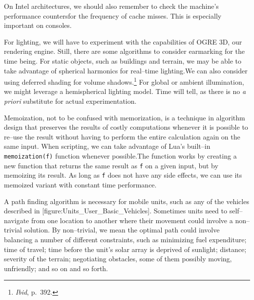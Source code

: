 On Intel architectures, we should also remember to check the machine's performance counters for the frequency of cache misses. This is especially important on consoles.

For lighting, we will have to experiment with the capabilities of OGRE 3D, our rendering engine. Still, there are some algorithms to consider earmarking for the time being. For static objects, such as buildings and terrain, we may be able to take advantage of spherical harmonics for real--time lighting. We can also consider using deferred shading for volume shadows.\footnote{{\it Ibid}, p.~392.} For global or ambient illumination, we might leverage a hemispherical lighting model. Time will tell, as there is no {\it a priori} substitute for actual experimentation.

Memoization, not to be confused with memorization, is a technique in algorithm design that preserves the results of costly computations whenever it is possible to re--use the result without having to perform the entire calculation again on the same input. When scripting, we can take advantage of Lua's built--in {\tt memoization(f)} function whenever possible. The function works by creating a new function that returns the same result as {\tt f} on a given input, but by memoizing its result. As long as {\tt f} does not have any side effects, we can use its memoized variant with constant time performance.

A path finding algorithm is necessary for mobile units, such as any of the vehicles described in [figure:Units_User_Basic_Vehicles]. Sometimes units need to self--navigate from one location to another where their movement could involve a non--trivial solution. By non--trivial, we mean the optimal path could involve balancing a number of different constraints, such as minimizing fuel expenditure; time of travel; time before the unit's solar array is deprived of sunlight; distance; severity of the terrain; negotiating obstacles, some of them possibly moving, unfriendly; and so on and so forth.
\crlf

    {}

